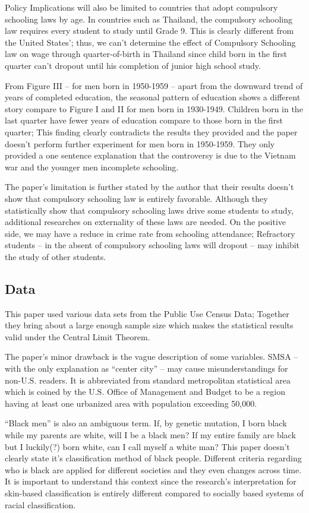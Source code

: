\documentclass{article}
\begin{document}
Policy Implications will also be limited to countries that adopt compulsory schooling laws by age. In countries such as Thailand, the compulsory schooling law requires every student to study until Grade 9. 
This is clearly different from the United States'; thus, we can't determine the effect of Compulsory Schooling law on wage through quarter-of-birth in Thailand since child born in the first quarter can't dropout until his completion of junior high school study.

From Figure III -- for men born in 1950-1959 -- apart from the downward trend of years of completed education, the seasonal pattern of education shows a different story compare to Figure I and II for men born in 1930-1949. Children born in the last quarter have fewer years of education compare to those born in the first quarter; This finding clearly contradicts the results they provided and the paper 
doesn't perform further experiment for men born in 1950-1959. They only provided a one sentence explanation that the controversy is due to the Vietnam war and the younger men incomplete schooling.

The paper's limitation is further stated by the author that their results doesn't show that compulsory schooling law is entirely favorable. Although they statistically show that compulsory schooling laws drive some students to study, additional researches on externality of these laws are needed. On the positive side, we may have  a reduce in crime rate from schooling attendance; Refractory students -- in the absent of compulsory schooling laws will dropout -- may inhibit the study of other students.

\subsection{Data}

This paper used various data sets from the Public Use Census Data; Together they bring about a large enough sample size which makes the statistical results valid under the Central Limit Theorem.

The paper's minor drawback is the vague description of some variables. SMSA -- with the only explanation as ``center city'' -- may cause misunderstandings for non-U.S. readers. It is abbreviated from standard metropolitan statistical area which is coined by the U.S. Office of Management and Budget to be a region having at least one urbanized area with population exceeding 50,000.

``Black men'' is also an ambiguous term. If, by genetic mutation, I born black while my parents are white, will I be a black men? If my entire family are black but I luckily(?) born white, can I call myself a white man? This paper doesn't clearly state it's classification method of black people. Different criteria regarding who is black are applied for different societies and they even changes across time. 
It is important to understand this context since the research's interpretation for skin-based classification is entirely different compared to socially based systems of racial classification.
\end{document}
